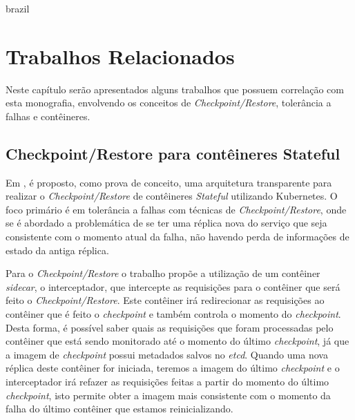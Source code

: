 

\begin{otherlanguage*}{brazil}
\chapter{Trabalhos Relacionados}\label{cap:trabalhos:relacionados}

Neste capítulo serão apresentados alguns trabalhos que possuem correlação
com esta monografia, envolvendo os conceitos de \textit{Checkpoint/Restore},
tolerância a falhas e contêineres.

\section{Checkpoint/Restore para contêineres Stateful}

Em \cite{muller2022architecture}, é proposto, como prova de conceito, uma
arquitetura transparente para realizar o \textit{Checkpoint/Restore} de
contêineres \textit{Stateful} utilizando Kubernetes. O foco primário é em
tolerância a falhas com técnicas de \textit{Checkpoint/Restore}, onde se é
abordado a problemática de se ter uma réplica nova do serviço que seja
consistente com o momento atual da falha, não havendo perda de informações
de estado da antiga réplica.

Para o \textit{Checkpoint/Restore} o trabalho propõe a utilização de um
contêiner \textit{sidecar}, o interceptador, que intercepte as requisições
para o contêiner que será feito o \textit{Checkpoint/Restore}. Este contêiner
irá redirecionar as requisições ao contêiner que é feito o \textit{checkpoint}
e também controla o momento do \textit{checkpoint}. Desta forma, é possível
saber quais as requisições que foram processadas pelo contêiner que está sendo
monitorado até o momento do último \textit{checkpoint}, já que a imagem de
\textit{checkpoint} possui metadados salvos no \textit{etcd}. Quando uma nova
réplica deste contêiner for iniciada, teremos a imagem do último
\textit{checkpoint} e o interceptador irá refazer as requisições feitas a
partir do momento do último \textit{checkpoint}, isto permite obter a imagem
mais consistente com o momento da falha do último contêiner que estamos
reinicializando.


\end{otherlanguage*}
